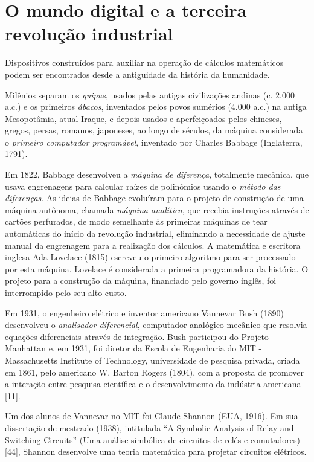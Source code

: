 \documentclass{hipatia}
\begin{document}
\section{O mundo digital e a terceira revolução industrial}


Dispositivos construídos para auxiliar na operação de cálculos matemáticos podem ser encontrados desde a antiguidade da história da humanidade.

Milênios separam os \textit{quipus}, usados pelas antigas civilizações andinas (c. 2.000 a.c.)  e os primeiros \textit{ábacos}, inventados pelos povos sumérios (4.000 a.c.) na antiga Mesopotâmia, atual Iraque, e depois usados e aperfeiçoados pelos chineses, gregos, persas, romanos, japoneses, ao longo de séculos, da máquina considerada o \textit{primeiro computador programável}, inventado por Charles Babbage (Inglaterra, 1791).

Em 1822, Babbage desenvolveu a \textit{máquina de diferença}, totalmente mecânica, que usava engrenagens para calcular raízes de polinômios usando o \textit{método das diferenças}. As ideias de Babbage evoluíram para o projeto de construção de uma máquina autônoma, chamada \textit{máquina analítica}, que recebia instruções através de cartões perfurados, de modo semelhante às primeiras máquinas de tear automáticas do início da revolução industrial, eliminando a necessidade de ajuste manual da engrenagem para a realização dos cálculos. A matemática e escritora inglesa Ada Lovelace (1815) escreveu o primeiro algoritmo para ser processado por esta máquina. Lovelace é considerada a primeira programadora da história. O projeto para a construção da máquina, financiado pelo governo inglês, foi interrompido pelo seu alto custo.

Em 1931, o engenheiro elétrico e inventor americano Vannevar Bush (1890) desenvolveu o \textit{analisador diferencial}, computador analógico mecânico que resolvia equações diferenciais através de integração. Bush participou do Projeto Manhattan e, em 1931, foi diretor da Escola de Engenharia do MIT - Massachusetts Institute of Technology, universidade de pesquisa privada, criada em 1861, pelo americano W. Barton Rogers (1804), com a proposta de promover a interação entre pesquisa científica e o desenvolvimento da indústria americana [11].

Um dos alunos de Vannevar no MIT foi Claude Shannon (EUA, 1916). Em sua dissertação de mestrado (1938), intitulada ``A Symbolic Analysis of Relay and Switching Circuits'' (Uma análise simbólica de circuitos de relés e comutadores) [44], Shannon desenvolve uma teoria matemática para projetar circuitos elétricos.
\end{document}
